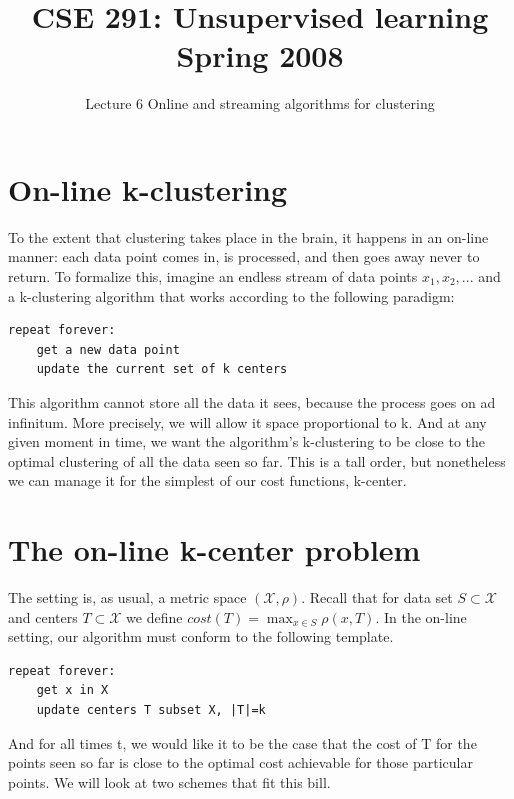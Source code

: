 \documentclass[letterpaper,10pt]{article}
\theoremstyle{plain}
\begin{document}
\title{CSE 291: Unsupervised learning \\ Spring 2008}
\author{}
\date{Lecture 6 Online and streaming algorithms for clustering}
\maketitle

\section{On-line k-clustering}
To the extent that clustering takes place in the brain, it happens in an on-line manner: each data point comes in, is processed, and then goes away never to return.  To formalize this, imagine an endless stream of data points $x_{1},x_{2},...$ and a k-clustering algorithm that works according to the following paradigm: 
\begin{verbatim}
repeat forever:
    get a new data point
    update the current set of k centers
\end{verbatim}
This algorithm cannot store all the data it sees, because the process goes on ad infinitum.  More precisely, we will allow it space proportional to k.  And at any given moment in time, we want the algorithm's k-clustering to be close to the optimal clustering of all the data seen so far.  This is a tall order, but nonetheless we can manage it for the simplest of our cost functions, k-center. 

\section{The on-line k-center problem}
The setting is, as usual, a metric space $(\mathcal{X}, \rho)$.  Recall that for data set $S\subset\mathcal{X}$ and centers $T\subset\mathcal{X}$ we define $cost(T)=\max_{x\in S}\rho(x,T).$  In the on-line setting, our algorithm must conform to the following template. 
\begin{verbatim}
repeat forever:
    get x in X
    update centers T subset X, |T|=k
\end{verbatim}
And for all times t, we would like it to be the case that the cost of T for the points seen so far is close to the optimal cost achievable for those particular points.  We will look at two schemes that fit this bill. 
\end{document}
